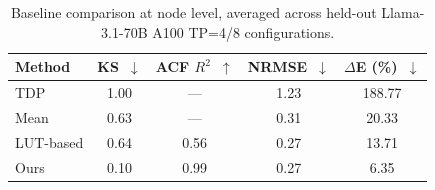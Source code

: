 \begin{table}[t]
\centering
\small
\caption{Baseline comparison at node level, averaged across held-out Llama-3.1-70B A100 TP=4/8 configurations.}
\label{tab:baselines-node}
\vspace{0.4em}
\begin{tabular}{lcccc}
\toprule
\textbf{Method} &
\textbf{KS~$\downarrow$} &
\textbf{ACF $R^2$~$\uparrow$} &
\textbf{NRMSE~$\downarrow$} &
\textbf{$\Delta$E (\%)~$\downarrow$} \\
\midrule
TDP & 1.00 & --- & 1.23 & 188.77 \\
Mean & 0.63 & --- & 0.31 & 20.33 \\
LUT-based & 0.64 & 0.56 & 0.27 & 13.71 \\
Ours & 0.10 & 0.99 & 0.27 & 6.35 \\
\bottomrule
\end{tabular}
\end{table}
